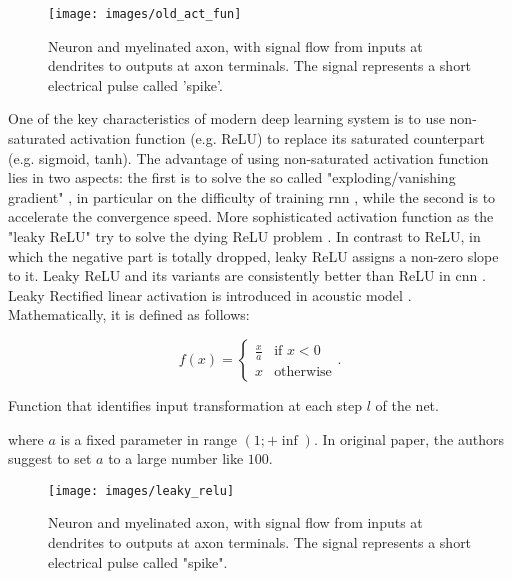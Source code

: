 \begin{figure}[H]
	\centering
	\texttt{[image: images/old\_act\_fun]}
	\caption[Image of a human neuron.]{Neuron and myelinated axon, with signal flow from inputs at dendrites to outputs at axon terminals. The signal represents a short electrical pulse called 'spike'.}
	\label{fig:old_act_fun}
\end{figure}

\noindent One of the key characteristics of modern deep learning system is to use non-saturated activation function (e.g. ReLU) to replace its saturated counterpart (e.g. sigmoid, tanh). The advantage of using non-saturated activation function lies in two aspects: the first is to solve the so called "exploding/vanishing gradient" \cite[]{bengio1994learning}, in particular on the difficulty of training \gls{rnn} \cite[]{pascanu2013difficulty}, while the second is to accelerate the convergence speed. More sophisticated activation function as the "leaky ReLU" try to solve the dying ReLU problem \cite[]{LeakyReL95:online}. In contrast to ReLU, in which the negative part is totally dropped, leaky ReLU assigns a non-zero slope to it. Leaky ReLU and its variants are consistently better than ReLU in \gls{cnn} \cite[]{xu2015empirical}. \\

\noindent Leaky Rectified linear activation is introduced in acoustic model \cite[]{maas2013rectifier}. Mathematically, it is defined as follows:

\begin{Equation}[H]
	\centering
	\begin{equation} \label{eq:leakyrelu}
 		f(x) = 
			\begin{cases}
			\frac{x}{a} & \text{if $x < 0 $} \\
			x & \text{otherwise}
		\end{cases} .
	\end{equation}
	\caption[Leaky Rectified linear activation.]{Function that identifies input transformation at each step $l$ of the net.}
\end{Equation}

\noindent where $a$ is a fixed parameter in range $(1; +\inf)$. In original paper, the authors suggest to set $a$ to a large number like $100$.

\begin{figure}[H]
	\centering
	\texttt{[image: images/leaky\_relu]}
	\caption[Leaky Rectified linear activation.]{Neuron and myelinated axon, with signal flow from inputs at dendrites to outputs at axon terminals. The signal represents a short electrical pulse called "spike".}
	\label{fig:leakyrelu}
\end{figure}

